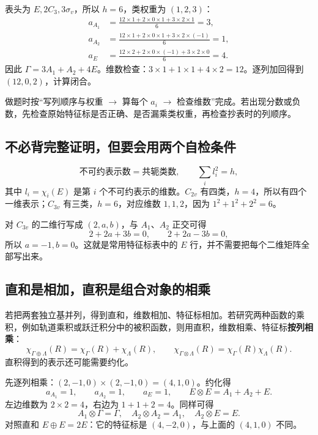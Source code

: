 \begin{worked}[讲义中的 $C_{3v}$ 约化：$(12,0,2)$]
表头为 $E,2C_3,3\sigma_v$，所以 $h=6$，类权重为 $(1,2,3)$：
\begin{align*}
a_{A_1}&=\frac{12\times1+2\times0\times1+3\times2\times1}{6}=3,\\
a_{A_2}&=\frac{12\times1+2\times0\times1+3\times2\times(-1)}{6}=1,\\
a_E&=\frac{12\times2+2\times0\times(-1)+3\times2\times0}{6}=4.
\end{align*}
因此 $\Gamma=3A_1+A_2+4E$。维数检查：$3\times1+1\times1+4\times2=12$。逐列加回得到 $(12,0,2)$，计算闭合。
\end{worked}

做题时按“写列顺序与权重 $\to$ 算每个 $a_i$ $\to$ 检查维数”完成。若出现分数或负数，先检查原始特征标是否正确、是否漏乘类权重，再检查抄表时的列顺序。

\subsection{不必背完整证明，但要会用两个自检条件}
\[
 \text{不可约表示数}=\text{共轭类数},\qquad
 \sum_i l_i^2=h,
\]
其中 $l_i=\chi_i(E)$ 是第 $i$ 个不可约表示的维数。$C_{2v}$ 有四类，$h=4$，所以有四个一维表示；$C_{3v}$ 有三类，$h=6$，对应维数 $1,1,2$，因为 $1^2+1^2+2^2=6$。

对 $C_{3v}$ 的二维行写成 $(2,a,b)$，与 $A_1$、$A_2$ 正交可得
\[
 2+2a+3b=0,\qquad 2+2a-3b=0,
\]
所以 $a=-1,b=0$。这就是常用特征标表中的 $E$ 行，并不需要把每个二维矩阵全部写出来。

\subsection{直和是相加，直积是组合对象的相乘}
\label{sec:products}
若把两套独立基并列，得到直和，维数相加、特征标相加。若研究两种函数的乘积，例如轨道乘积或跃迁积分中的被积函数，则用直积，维数相乘、特征标\textbf{按列相乘}：
\[
 \chi_{\Gamma\oplus\Lambda}(R)=\chi_\Gamma(R)+\chi_\Lambda(R),\qquad
 \chi_{\Gamma\otimes\Lambda}(R)=\chi_\Gamma(R)\chi_\Lambda(R).
\]
直积得到的表示还可能需要约化。

\begin{worked}
先逐列相乘：$(2,-1,0)\times(2,-1,0)=(4,1,0)$。约化得
\[
 a_{A_1}=1,\qquad a_{A_2}=1,\qquad a_E=1,
 \qquad \boxed{E\otimes E=A_1+A_2+E}.
\]
左边维数为 $2\times2=4$，右边为 $1+1+2=4$。同样可得
\[
 A_1\otimes\Gamma=\Gamma,\quad
 A_2\otimes A_2=A_1,\quad A_2\otimes E=E.
\]
对照直和 $E\oplus E=2E$：它的特征标是 $(4,-2,0)$，与上面的 $(4,1,0)$ 不同。
\end{worked}

